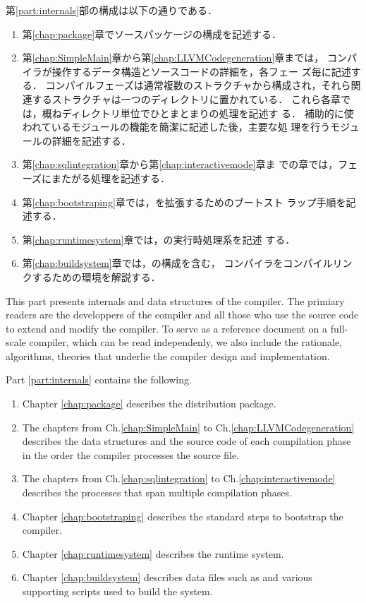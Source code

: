 	第\ref{part:internals}部の構成は以下の通りである．
\begin{enumerate}
\item 第\ref{chap:package}章で\smlsharp{}ソースパッケージの構成を記述する．
\item 
      第\ref{chap:SimpleMain}章から第\ref{chap:LLVMCodegeneration}章までは，
\smlsharp{}コンパイラが操作するデータ構造とソースコードの詳細を，各フェー
ズ毎に記述する．
	コンパイルフェーズは通常複数のストラクチャから構成され，それら関
連するストラクチャは一つのディレクトリに置かれている．
	これら各章では，概ねディレクトリ単位でひとまとまりの処理を記述す
る． 
	補助的に使われているモジュールの機能を簡潔に記述した後，主要な処
理を行うモジュールの詳細を記述する．
\item 第\ref{chap:sqlintegration}章から第\ref{chap:interactivemode}章ま
での章では，フェーズにまたがる処理を記述する．
\item 第\ref{chap:bootstraping}章では，\smlsharp{}を拡張するためのブートスト
ラップ手順を記述する．
\item 第\ref{chap:runtimesystem}章では，\smlsharp{}の実行時処理系を記述
する．
\item 第\ref{chap:buildsystem}章では，の構成を含む，
\smlsharp{}コンパイラをコンパイルリンクするための環境を解説する．
\end{enumerate}
\else%
	This part presents internals and data structures of the
\smlsharp{} compiler.
	The primiary readers are the developpers of the \smlsharp{}
compiler and all those who use the \smlsharp{} source code to extend and
modify the compiler. 
	To serve as a reference document on a full-scale compiler, which
can be read independenly, we also include the rationale, algorithms,
theories that underlie the compiler design and implementation. 

	Part \ref{part:internals} contains the following.
\begin{enumerate}
\item Chapter \ref{chap:package} describes the \smlsharp{} distribution
package.
\item 
      The chapters from Ch.\ref{chap:SimpleMain} to
Ch.\ref{chap:LLVMCodegeneration} describes the data structures and the
source code of each compilation phase in the order the compiler
processes  the source file.
\item 
	The chapters from Ch.\ref{chap:sqlintegration} to
Ch.\ref{chap:interactivemode} describes the processes that span
multiple compilation phases.
\item Chapter \ref{chap:bootstraping} describes the standard steps to
bootstrap the \smlsharp{} compiler.
\item 
	Chapter \ref{chap:runtimesystem} describes the runtime system.
\item 
	Chapter \ref{chap:buildsystem} describes data files such as
 and various supporting scripts used to build the
\smlsharp{} system. 
\end{enumerate}
\fi%

